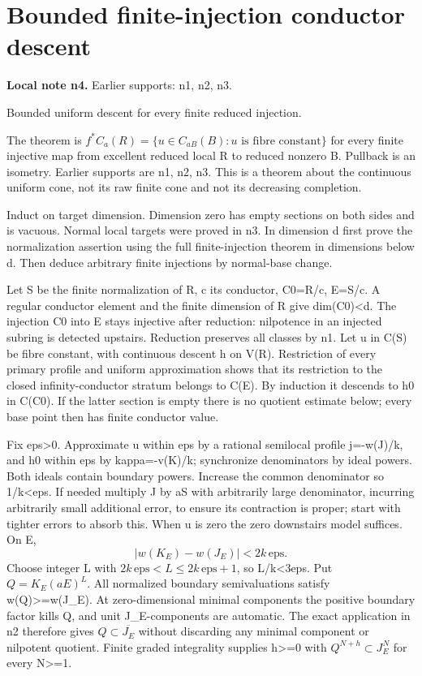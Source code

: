\documentclass[11pt]{article}
\begin{document}
\section{Bounded finite-injection conductor descent}
\label{sec:n4}
\noindent\textbf{Local note n4.} Earlier supports: n1, n2, n3.

Bounded uniform descent for every finite reduced injection.

The theorem is \(f^*C_a(R)=\{u\in C_{aB}(B):u\text{ is fibre constant}\}\) for every finite injective map from excellent reduced local R to reduced nonzero B. Pullback is an isometry. Earlier supports are n1, n2, n3. This is a theorem about the continuous uniform cone, not its raw finite cone and not its decreasing completion.

Induct on target dimension. Dimension zero has empty sections on both sides and is vacuous. Normal local targets were proved in n3. In dimension d first prove the normalization assertion using the full finite-injection theorem in dimensions below d. Then deduce arbitrary finite injections by normal-base change.

Let S be the finite normalization of R, c its conductor, C0=R/c, E=S/c. A regular conductor element and the finite dimension of R give dim(C0)<d. The injection C0 into E stays injective after reduction: nilpotence in an injected subring is detected upstairs. Reduction preserves all classes by n1. Let u in C(S) be fibre constant, with continuous descent h on V(R). Restriction of every primary profile and uniform approximation shows that its restriction to the closed infinity-conductor stratum belongs to C(E). By induction it descends to h0 in C(C0). If the latter section is empty there is no quotient estimate below; every base point then has finite conductor value.

Fix eps>0. Approximate u within eps by a rational semilocal profile j=-w(J)/k, and h0 within eps by kappa=-v(K)/k; synchronize denominators by ideal powers. Both ideals contain boundary powers. Increase the common denominator so 1/k<eps. If needed multiply J by aS with arbitrarily large denominator, incurring arbitrarily small additional error, to ensure its contraction is proper; start with tighter errors to absorb this. When u is zero the zero downstairs model suffices. On E,
\[
 |w(K_E)-w(J_E)|<2k\,\mathrm{eps}.
\]
Choose integer L with \(2k\,\mathrm{eps}<L\le2k\,\mathrm{eps}+1\), so L/k<3eps. Put \(Q=K_E(aE)^L\). All normalized boundary semivaluations satisfy w(Q)>=w(J\_E). At zero-dimensional minimal components the positive boundary factor kills Q, and unit J\_E-components are automatic. The exact application in n2 therefore gives \(Q\subset\overline{J_E}\) without discarding any minimal component or nilpotent quotient. Finite graded integrality supplies h>=0 with \(Q^{N+h}\subset J_E^N\) for every N>=1.
\end{document}
